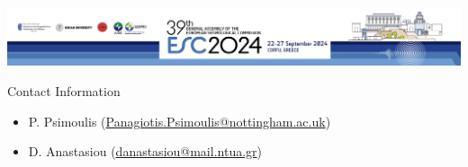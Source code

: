 \documentclass[final,a0,portrait]{beamer}
\newlength{\sepwid}
\newlength{\onecolwid}
\begin{document}
\begin{frame}[t]
\begin{columns}[t]
\begin{column}{\onecolwid}
\vspace*{-1.9cm}
\begin{minipage}{\onecolwid}
  \begin{column}{\onecolwid}
		\vspace*{1.0\baselineskip}
		\begin{center}
		  \includegraphics[width=\textwidth]{figures/ESC2024_webheader.png}
		\end{center}
		\begin{alertblock}{Contact Information}
    {\small
  		\begin{itemize}
	  		\item P. Psimoulis (\href{Panagiotis.Psimoulis@nottingham.ac.uk}{Panagiotis.Psimoulis@nottingham.ac.uk})
		  	\item D. Anastasiou (\href{danastasiou@mail.ntua.gr}{danastasiou@mail.ntua.gr})
		  \end{itemize}
		  }
  	\end{alertblock}
  \end{column}
\end{minipage}


\end{column}
\end{columns}
\end{frame}
\end{document}
